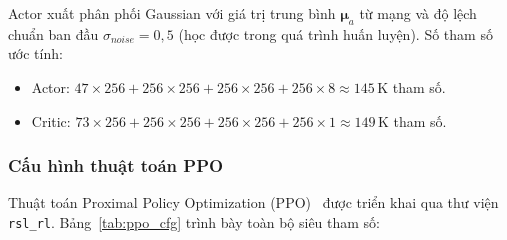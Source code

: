 Actor xuất phân phối Gaussian với giá trị trung bình $\boldsymbol{\mu}_a$ từ mạng
và độ lệch chuẩn ban đầu $\sigma_{noise} = 0{,}5$ (học được trong quá trình huấn luyện).
Số tham số ước tính:
\begin{itemize}
    \item Actor: $47\times256 + 256\times256 + 256\times256 + 256\times8
                 \approx 145\,\text{K}$ tham số.
    \item Critic: $73\times256 + 256\times256 + 256\times256 + 256\times1
                 \approx 149\,\text{K}$ tham số.
\end{itemize}

\subsubsection{Cấu hình thuật toán PPO}

Thuật toán Proximal Policy Optimization (PPO)~\cite{schulman2017ppo}
được triển khai qua thư viện \texttt{rsl\_rl}. Bảng~\ref{tab:ppo_cfg}
trình bày toàn bộ siêu tham số:

